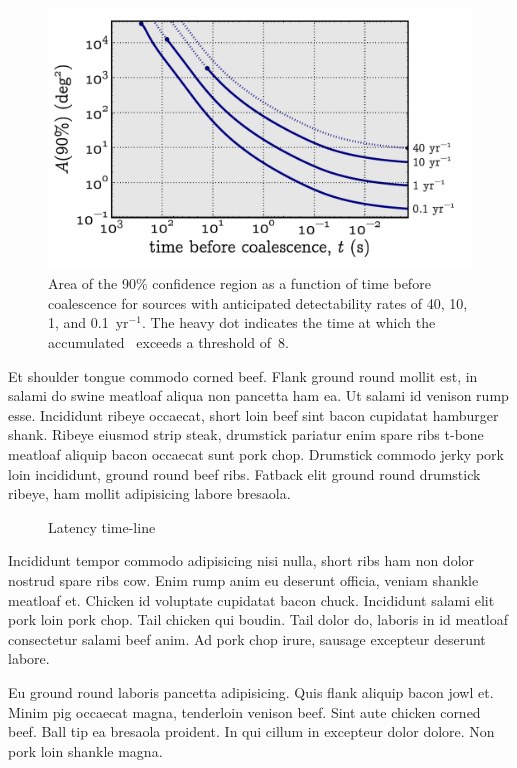 \documentclass[portrait,plainboxedsections]{sciposter}
\begin{document}
\begin{minipage}[t]{0.25\textwidth}
\begin{figure}[h]
\includegraphics[width=\textwidth]{figures/loc_in_time}
\caption{\label{fig:sky-localization-accuracy}Area of the 90\% confidence
region as a function of time before coalescence for sources with anticipated
detectability rates of 40, 10, 1, and 0.1~yr$^{-1}$. The heavy dot indicates
the time at which the accumulated \SNR\ exceeds a threshold of~8.}
\end{figure}

Et shoulder tongue commodo corned beef. Flank ground round mollit est, in
salami do swine meatloaf aliqua non pancetta ham ea. Ut salami id venison rump
esse. Incididunt ribeye occaecat, short loin beef sint bacon cupidatat
hamburger shank. Ribeye eiusmod strip steak, drumstick pariatur enim spare ribs
t-bone meatloaf aliquip bacon occaecat sunt pork chop. Drumstick commodo jerky
pork loin incididunt, ground round beef ribs. Fatback elit ground round
drumstick ribeye, ham mollit adipisicing labore bresaola.

\begin{figure}
\caption{Latency time-line}
\label{f:latency_timeline}
\end{figure}

Incididunt tempor commodo adipisicing nisi nulla, short ribs ham non dolor
nostrud spare ribs cow. Enim rump anim eu deserunt officia, veniam shankle
meatloaf et. Chicken id voluptate cupidatat bacon chuck. Incididunt salami elit
pork loin pork chop. Tail chicken qui boudin. Tail dolor do, laboris in id
meatloaf consectetur salami beef anim. Ad pork chop irure, sausage excepteur
deserunt labore.

Eu ground round laboris pancetta adipisicing. Quis flank aliquip bacon jowl et.
Minim pig occaecat magna, tenderloin venison beef. Sint aute chicken corned
beef. Ball tip ea bresaola proident. In qui cillum in excepteur dolor dolore.
Non pork loin shankle magna.

\end{minipage}%
\end{document}
